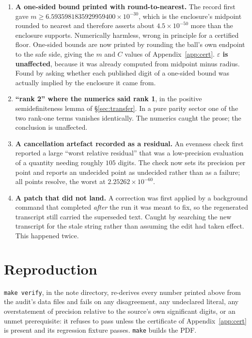 \documentclass[11pt,a4paper]{article}
\theoremstyle{remark}
\begin{document}
\begin{enumerate}\itemsep3pt
\setcounter{enumi}{6}
\item \textbf{A one-sided bound printed with round-to-nearest.} The record first gave
$m\ge6.5935981835929959400\times10^{-30}$, which is the enclosure's midpoint rounded to
nearest and therefore asserts about $4.5\times10^{-50}$ more than the enclosure supports.
Numerically harmless, wrong in principle for a certified floor. One-sided bounds are now
printed by rounding the ball's own endpoint to the safe side, giving the $m$ and $C$ values
of Appendix~\ref{app:cert}. \textbf{$\varepsilon$ is unaffected}, because it was already
computed from midpoint minus radius. Found by asking whether each published digit of a
one-sided bound was actually implied by the enclosure it came from.

\item \textbf{``rank 2'' where the numerics said rank 1}, in the positive semidefiniteness
lemma of \S\ref{sec:transfer}. In a pure parity sector one of the two rank-one terms
vanishes identically. The numerics caught the prose; the conclusion is unaffected.

\item \textbf{A cancellation artefact recorded as a residual.} An evenness check first
reported a large ``worst relative residual'' that was a low-precision evaluation of a
quantity needing roughly $105$ digits. The check now sets its precision per point and
reports an undecided point as undecided rather than as a failure; all points resolve, the
worst at $2.25262\times10^{-60}$.

\item \textbf{A patch that did not land.} A correction was first applied by a background
command that completed \emph{after} the run it was meant to fix, so the regenerated
transcript still carried the superseded text. Caught by searching the new transcript for the
stale string rather than assuming the edit had taken effect. This happened twice.
\end{enumerate}

\section{Reproduction}\label{app:repro}

\noindent \texttt{make verify}, in the note directory, re-derives every number printed above
from the audit's data files and fails on any disagreement, any undeclared literal, any
overstatement of precision relative to the source's own significant digits, or an unmet
prerequisite: it refuses to pass unless the certificate of Appendix~\ref{app:cert} is
present and its regression fixture passes. \texttt{make} builds the PDF.
\end{document}
